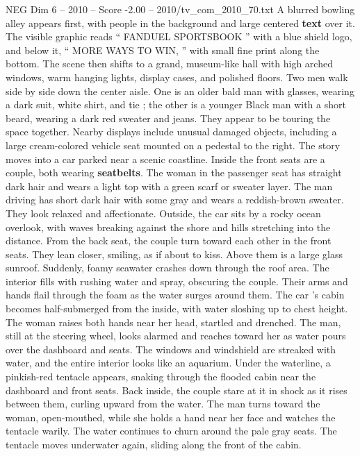\begin{textsample}{NEG Dim 6 – 2010 – Score -2.00 – 2010/tv\_com\_2010\_70.txt}  \label{ex:f6_neg_008}
A blurred bowling alley appears first, with people in the background and large centered \textbf{text} over it.
The visible graphic reads “ FANDUEL SPORTSBOOK ” with a blue shield logo, and below it, “ MORE WAYS TO WIN, ” with small fine print along the bottom.
The scene then shifts to a grand, museum-like hall with high arched windows, warm hanging lights, display cases, and polished floors.
Two men walk side by side down the center aisle.
One is an older bald man with glasses, wearing a dark suit, white shirt, and tie ; the other is a younger Black man with a short beard, wearing a dark red sweater and jeans.
They appear to be touring the space together.
Nearby displays include unusual damaged objects, including a large cream-colored vehicle seat mounted on a pedestal to the right.
The story moves into a car parked near a scenic coastline.
Inside the front seats are a couple, both wearing \textbf{seatbelts}.
The woman in the passenger seat has straight dark hair and wears a light top with a green scarf or sweater layer.
The man driving has short dark hair with some gray and wears a reddish-brown sweater.
They look relaxed and affectionate.
Outside, the car sits by a rocky ocean overlook, with waves breaking against the shore and hills stretching into the distance.
From the back seat, the couple turn toward each other in the front seats.
They lean closer, smiling, as if about to kiss.
Above them is a large glass sunroof.
Suddenly, foamy seawater crashes down through the roof area.
The interior fills with rushing water and spray, obscuring the couple.
Their arms and hands flail through the foam as the water surges around them.
The car ’s cabin becomes half-submerged from the inside, with water sloshing up to chest height.
The woman raises both hands near her head, startled and drenched.
The man, still at the steering wheel, looks alarmed and reaches toward her as water pours over the dashboard and seats.
The windows and windshield are streaked with water, and the entire interior looks like an aquarium.
Under the waterline, a pinkish-red tentacle appears, snaking through the flooded cabin near the dashboard and front seats.
Back inside, the couple stare at it in shock as it rises between them, curling upward from the water.
The man turns toward the woman, open-mouthed, while she holds a hand near her face and watches the tentacle warily.
The water continues to churn around the pale gray seats.
The tentacle moves underwater again, sliding along the front of the cabin.

\end{textsample}
